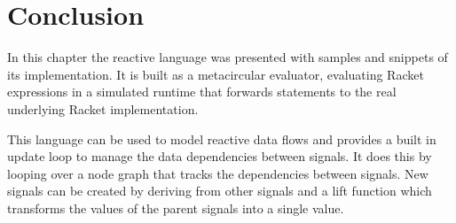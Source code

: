 \section{Conclusion}

In this chapter the reactive language was presented with samples and snippets of its implementation.
It is built as a metacircular evaluator, evaluating Racket expressions in a simulated runtime that forwards statements to the real underlying Racket implementation. 

This language can be used to model reactive data flows and provides a built in update loop to manage the data dependencies between signals. It does this by looping over a node graph that tracks the dependencies between signals. New signals can be created by deriving from other signals and a lift function which transforms the values of the parent signals into a single value.